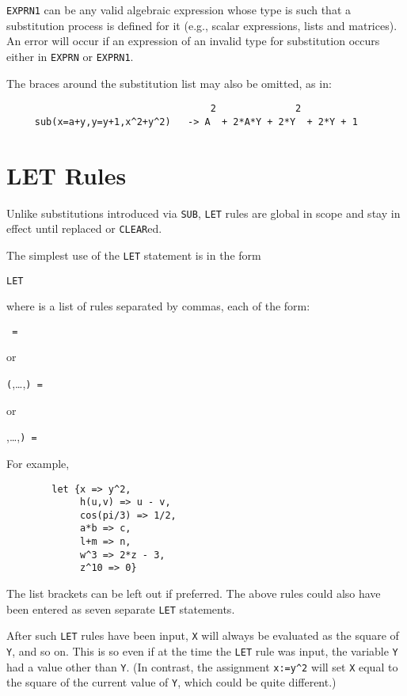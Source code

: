 \texttt{EXPRN1} can be any valid algebraic expression whose type is such that
a substitution process is defined for it (e.g., scalar expressions, lists
and matrices).  An error will occur if an expression of an invalid type
for substitution occurs either in \texttt{EXPRN} or \texttt{EXPRN1}.

The braces around the substitution list may also be omitted, as in:
\begin{verbatim}
                                    2              2
     sub(x=a+y,y=y+1,x^2+y^2)   -> A  + 2*A*Y + 2*Y  + 2*Y + 1
\end{verbatim}

\section{LET Rules}
\hypertarget{command:LET}{}
\hypertarget{reserved:impliesop}{}
Unlike substitutions introduced via \texttt{SUB}, \texttt{LET}
rules are global in scope and stay in effect until replaced or \texttt{CLEAR}ed.

The simplest use of the \texttt{LET} statement is in the form
\begin{syntax}
        \texttt{LET }
\end{syntax}
where  is a list of rules separated by commas, each
of the form:
\begin{syntax}
        \texttt{ = } 
\end{syntax}
or
\begin{syntax}
   \texttt{(},\dots,\texttt{) = }
\end{syntax}
or
\begin{syntax}
    ,\dots,\texttt{) = }
\end{syntax}
For example,
\begin{verbatim}
        let {x => y^2,
             h(u,v) => u - v,
             cos(pi/3) => 1/2,
             a*b => c,
             l+m => n,
             w^3 => 2*z - 3,
             z^10 => 0}
\end{verbatim}
The list brackets can be left out if preferred.  The above rules could
also have been entered as seven separate \texttt{LET} statements.

After such \texttt{LET} rules have been input, \texttt{X} will always be
evaluated as the square of \texttt{Y}, and so on.  This is so even if at the
time the \texttt{LET} rule was input, the variable \texttt{Y} had a value other
than \texttt{Y}. (In contrast, the assignment \texttt{x:=y\textasciicircum2} 
will set \texttt{X}
equal to the square of the current value of \texttt{Y}, which could be quite
different.)


